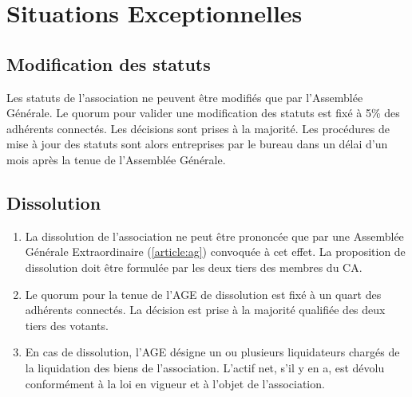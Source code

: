 \documentclass[12pt, a4paper]{article}
\begin{document}
\section{Situations Exceptionnelles}

\subsection{Modification des statuts} \label{article:statuts}

Les statuts de l’association ne peuvent être modifiés que par l’Assemblée Générale. Le quorum pour valider une modification des statuts est fixé à 5\% des adhérents connectés. Les décisions sont prises à la majorité. Les procédures de mise à jour des statuts sont alors entreprises par le bureau dans un délai d’un mois après la tenue de l’Assemblée Générale.

\subsection{Dissolution} \label{article:dissolution}

\begin{enumerate}
    \item La dissolution de l’association ne peut être prononcée que par une Assemblée Générale Extraordinaire (\ref{article:ag}) convoquée à cet effet. La proposition de dissolution doit être formulée par les deux tiers des membres du CA.
    \item Le quorum pour la tenue de l’AGE de dissolution est fixé à un quart des adhérents connectés. La décision est prise à la majorité qualifiée des deux tiers des votants.
    \item En cas de dissolution, l’AGE désigne un ou plusieurs liquidateurs chargés de la liquidation des biens de l’association. L’actif net, s’il y en a, est dévolu conformément à la loi en vigueur et à l’objet de l’association.
\end{enumerate}
\end{document}
